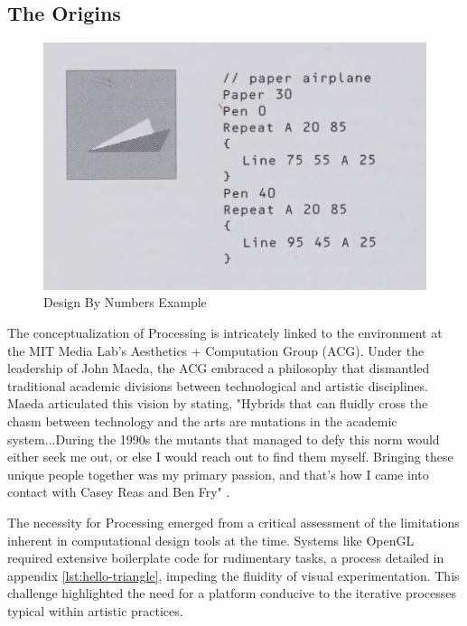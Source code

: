 
\subsection{The Origins}
\begin{figure}
    \includegraphics[max width=\textwidth]{images/dbn.png} 
    \caption{Design By Numbers Example \parencite[66]{maedaDesignNumbers2001}}
    \label{fig:dbn}
  \end{figure}

The conceptualization of Processing is intricately linked to the environment at the MIT Media Lab's Aesthetics + Computation Group (ACG). Under the leadership of John Maeda, the ACG embraced a philosophy that dismantled traditional academic divisions between technological and artistic disciplines. Maeda articulated this vision by stating, "Hybrids that can fluidly cross the chasm between technology and the arts are mutations in the academic system...During the 1990s the mutants that managed to defy this norm would either seek me out, or else I would reach out to find them myself. Bringing these unique people together was my primary passion, and that’s how I came into contact with Casey Reas and Ben Fry" \parencite{reasProcessingProgrammingHandbook2007a}.

The necessity for Processing emerged from a critical assessment of the limitations inherent in computational design tools at the time. Systems like OpenGL required extensive boilerplate code for rudimentary tasks, a process detailed in appendix \ref{lst:hello-triangle}, impeding the fluidity of visual experimentation. This challenge highlighted the need for a platform conducive to the iterative processes typical within artistic practices.

